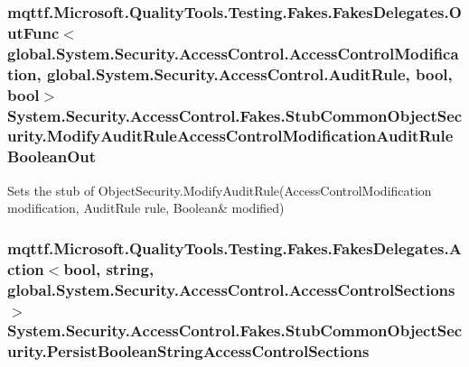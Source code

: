 \hypertarget{class_system_1_1_security_1_1_access_control_1_1_fakes_1_1_stub_common_object_security_aa82b9f88a60e569e45ced048289bab06}{
\subsubsection[{Modify\-Audit\-Rule\-Access\-Control\-Modification\-Audit\-Rule\-Boolean\-Out}]{\setlength{\rightskip}{0pt plus 5cm}mqttf.\-Microsoft.\-Quality\-Tools.\-Testing.\-Fakes.\-Fakes\-Delegates.\-Out\-Func$<$global.\-System.\-Security.\-Access\-Control.\-Access\-Control\-Modification, global.\-System.\-Security.\-Access\-Control.\-Audit\-Rule, bool, bool$>$ System.\-Security.\-Access\-Control.\-Fakes.\-Stub\-Common\-Object\-Security.\-Modify\-Audit\-Rule\-Access\-Control\-Modification\-Audit\-Rule\-Boolean\-Out}}\label{class_system_1_1_security_1_1_access_control_1_1_fakes_1_1_stub_common_object_security_aa82b9f88a60e569e45ced048289bab06}


Sets the stub of Object\-Security.\-Modify\-Audit\-Rule(Access\-Control\-Modification modification, Audit\-Rule rule, Boolean\& modified)

\hypertarget{class_system_1_1_security_1_1_access_control_1_1_fakes_1_1_stub_common_object_security_a03ca772cead84d5d4eb2221ffba6396b}{
\subsubsection[{Persist\-Boolean\-String\-Access\-Control\-Sections}]{\setlength{\rightskip}{0pt plus 5cm}mqttf.\-Microsoft.\-Quality\-Tools.\-Testing.\-Fakes.\-Fakes\-Delegates.\-Action$<$bool, string, global.\-System.\-Security.\-Access\-Control.\-Access\-Control\-Sections$>$ System.\-Security.\-Access\-Control.\-Fakes.\-Stub\-Common\-Object\-Security.\-Persist\-Boolean\-String\-Access\-Control\-Sections}}\label{class_system_1_1_security_1_1_access_control_1_1_fakes_1_1_stub_common_object_security_a03ca772cead84d5d4eb2221ffba6396b}



